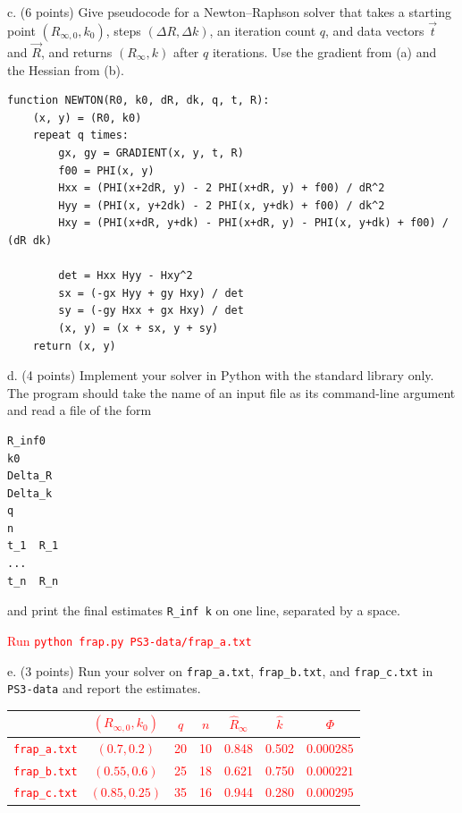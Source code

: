 \documentclass[11pt]{article}
\begin{document}
c. (6 points) Give pseudocode for a Newton--Raphson solver that takes a starting point
$(R_{\infty,0},k_0)$, steps $(\Delta R,\Delta k)$, an iteration count $q$, and data vectors
$\vec t$ and $\vec R$, and returns $(R_\infty,k)$ after $q$ iterations. Use the gradient from (a)
and the Hessian from (b).

{\color{red}
\begin{lstlisting}[style=code,basicstyle=\ttfamily\small\color{red},commentstyle=\color{red}\itshape]
function NEWTON(R0, k0, dR, dk, q, t, R):
    (x, y) = (R0, k0)
    repeat q times:
        gx, gy = GRADIENT(x, y, t, R)
        f00 = PHI(x, y)
        Hxx = (PHI(x+2dR, y) - 2 PHI(x+dR, y) + f00) / dR^2
        Hyy = (PHI(x, y+2dk) - 2 PHI(x, y+dk) + f00) / dk^2
        Hxy = (PHI(x+dR, y+dk) - PHI(x+dR, y) - PHI(x, y+dk) + f00) / (dR dk)

        det = Hxx Hyy - Hxy^2
        sx = (-gx Hyy + gy Hxy) / det
        sy = (-gy Hxx + gx Hxy) / det
        (x, y) = (x + sx, y + sy)
    return (x, y)
\end{lstlisting}
}

d. (4 points) Implement your solver in Python with the standard library only. The program
should take the name of an input file as its command-line argument and read a file of the form
\begin{center}
\begin{minipage}{0.3\linewidth}
\begin{lstlisting}
R_inf0
k0
Delta_R
Delta_k
q
n
t_1  R_1
...
t_n  R_n
\end{lstlisting}
\end{minipage}
\end{center}
and print the final estimates {\tt R\_inf k} on one line, separated by a space.

\textcolor{red}{
Run {\tt python frap.py PS3-data/frap\_a.txt}
}

e. (3 points) Run your solver on {\tt frap\_a.txt}, {\tt frap\_b.txt}, and {\tt frap\_c.txt} in
{\tt PS3-data} and report the estimates.
\textcolor{red}{
\begin{center}
\begin{tabular}{lcccccc}
 & $(R_{\infty,0}, k_0)$ & $q$ & $n$ & $\hat R_\infty$ & $\hat k$ & $\Phi$ \\ \hline
{\tt frap\_a.txt} & $(0.7, 0.2)$ & 20 & 10 & 0.848 & 0.502 & $0.000285$ \\
{\tt frap\_b.txt} & $(0.55, 0.6)$ & 25 & 18 & 0.621 & 0.750 & $0.000221$ \\
{\tt frap\_c.txt} & $(0.85, 0.25)$ & 35 & 16 & 0.944 & 0.280 & $0.000295$
\end{tabular}
\end{center}
}
\end{document}

